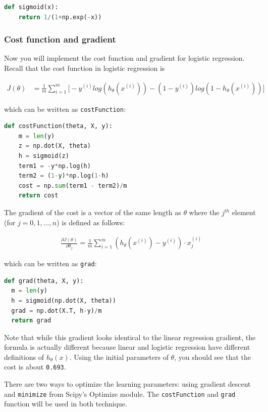 \documentclass[12pt]{article}
\begin{document}
\begin{lstlisting}[language=Python]
  def sigmoid(x):
    return 1/(1+np.exp(-x))
\end{lstlisting}

\subsubsection{Cost function and gradient}

Now you will implement the cost function and gradient for logistic regression. Recall that the cost function in logistic regression is

\begin{align}
  J(\theta) & = \frac{1}{m}\sum_{i=1}^m{\big[-y^{(i)}log(h_\theta(x^{(i)}))-(1-y^{(i)})log(1-h_\theta(x^{(i)}))\big]}
\end{align}

which can be written as \texttt{costFunction}:

\begin{lstlisting}[language=Python]
  def costFunction(theta, X, y):
    m = len(y)
    z = np.dot(X, theta)
    h = sigmoid(z)
    term1 = -y*np.log(h)
    term2 = (1-y)*np.log(1-h)
    cost = np.sum(term1 - term2)/m
    return cost
\end{lstlisting}

The gradient of the cost is a vector of the same length as $\theta$ where the $j^{th}$ element (for $j = 0, 1, ... , n$) is defined as follows:

\begin{align}
  \frac{\partial J(\theta)}{\partial \theta_j} = \frac{1}{m}\sum_{i=1}^m{(h_\theta(x^{(i)})-y^{(i)})\cdot x_j^{(i)}}
\end{align}

which can be written as \texttt{grad}:

\begin{lstlisting}[language=Python]
  def grad(theta, X, y):
  m = len(y)
  h = sigmoid(np.dot(X, theta))
  grad = np.dot(X.T, h-y)/m
  return grad
\end{lstlisting}

Note that while this gradient looks identical to the linear regression gradient, the formula is actually different because linear and logistic regression have different definitions of $h_\theta(x)$. Using the initial parameters of $\theta$, you should see that the cost is about \texttt{0.693}.

There are two ways to optimize the learning parameters: using gradient descent and \verb|minimize| from Scipy's Optimize module. The \texttt{costFunction} and \texttt{grad} function will be used in both technique.
\end{document}
